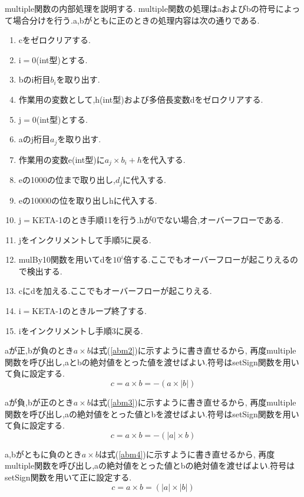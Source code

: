 \documentclass[a4j] {jarticle}
\begin{document}
  multiple関数の内部処理を説明する.
  multiple関数の処理はaおよびbの符号によって場合分けを行う.a,bがともに正のときの処理内容は次の通りである.
  \begin{enumerate}
    \item cをゼロクリアする.
    \item i$=$0(int型)とする.
    \item bのi桁目$b_i$を取り出す.
    \item 作業用の変数として,h(int型)および多倍長変数dをゼロクリアする.
    \item j$=$0(int型)とする.
    \item aのj桁目$a_j$を取り出す.
    \item 作業用の変数e(int型)に$a_j\times b_i+h$を代入する.
    \item eの1000の位まで取り出し,$d_j$に代入する.
    \item eの10000の位を取り出しhに代入する.
    \item j$=$KETA-1のとき手順11を行う.hが0でない場合,オーバーフローである.
    \item jをインクリメントして手順5に戻る.
    \item mulBy10関数を用いてdを$10^i$倍する.ここでもオーバーフローが起こりえるので検出する.
    \item cにdを加える.ここでもオーバーフローが起こりえる.
    \item i$=$KETA-1のときループ終了する.
    \item iをインクリメントし手順3に戻る.
  \end{enumerate}
  aが正,bが負のとき$a\times b$は式(\ref{abm2})に示すように書き直せるから,
  再度multiple関数を呼び出し,aとbの絶対値をとった値を渡せばよい.符号はsetSign関数を用いて負に設定する.
  \begin{equation}
    c = a\times b = -(a\times |b|)
    \label{abm2}
    \end{equation}

    aが負,bが正のとき$a\times b$は式(\ref{abm3})に示すように書き直せるから,
  再度multiple関数を呼び出し,aの絶対値をとった値とbを渡せばよい.符号はsetSign関数を用いて負に設定する.
  \begin{equation}
    c = a\times b = -(|a|\times b)
    \label{abm3}
    \end{equation}

    a,bがともに負のとき$a\times b$は式(\ref{abm4})に示すように書き直せるから,
  再度multiple関数を呼び出し,aの絶対値をとった値とbの絶対値を渡せばよい.符号はsetSign関数を用いて正に設定する.
  \begin{equation}
    c = a\times b = (|a|\times |b|)
    \label{abm4}
    \end{equation}
\end{document}
